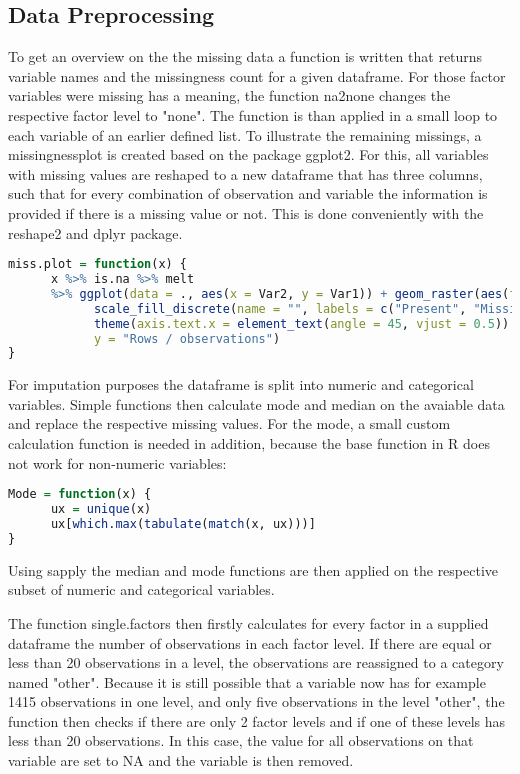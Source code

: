 \subsection{Data Preprocessing}

To  get an overview on the  the missing data a function is written that returns variable names and the missingness count for a given dataframe. 
For those factor variables were missing has a meaning, the function na2none changes the respective factor level to "none". 
The function is than applied in a small loop to each variable of an earlier defined list. 
To illustrate the remaining missings, a  missingnessplot  is created based on the package ggplot2. For this, all variables with missing values are reshaped to a new dataframe that has three columns, such that for every combination of observation and variable the information is provided if there is a missing value or not. This is done conveniently with the reshape2 and dplyr package.  

\begin{lstlisting}[language=R]
miss.plot = function(x) {
      x %>% is.na %>% melt 
      %>% ggplot(data = ., aes(x = Var2, y = Var1)) + geom_raster(aes(fill = value)) + 
            scale_fill_discrete(name = "", labels = c("Present", "Missing")) + theme_classic() + 
            theme(axis.text.x = element_text(angle = 45, vjust = 0.5)) + labs(x = "Variables in Dataset", 
            y = "Rows / observations")
}
\end{lstlisting}


For imputation purposes the dataframe is split into numeric and categorical variables. 
Simple functions then calculate mode and median on the avaiable data and replace the respective missing values.
For the mode, a small custom calculation function is needed in addition, because the base function in R does not work for non-numeric variables: 
\begin{lstlisting}[language=R]
Mode = function(x) {
      ux = unique(x)
      ux[which.max(tabulate(match(x, ux)))]
}
\end{lstlisting}
Using sapply the median and mode functions are then applied on the respective subset of numeric and categorical variables. 

The function single.factors then firstly calculates for every factor in a supplied dataframe the number of observations in each factor level. If there are equal or less than 20 observations in a level, the observations are reassigned to a category named "other". 
Because it is still possible that a variable now has for example 1415 observations in one level, and only five observations in the level "other", the function then checks if there are only 2 factor levels and if one of these levels has less than 20 observations. In this case, the value for all observations on that variable are set to NA and the variable is then removed.

